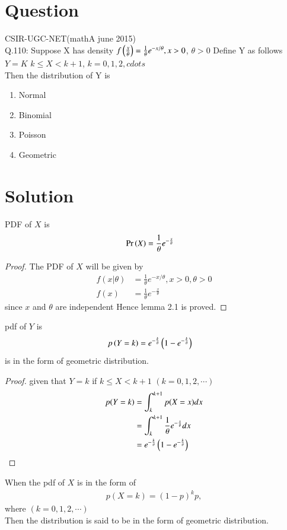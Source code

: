 \documentclass[journal,12pt,twocolumn]{IEEEtran}
\begin{document}
\section{Question}
CSIR-UGC-NET(mathA june 2015) \\
Q.110: Suppose X has density
$f\left(\frac{x}{\theta}\right)=\frac{1}{\theta} e^{-x/\theta},x>0$, $\theta >0$ 
Define Y as follows
$Y = K$ $k \leqslant X < k+1$, $k= 0,1,2,cdots$\\
Then the distribution of Y is
\begin{enumerate}
\item Normal 
\item Binomial 
\item Poisson 
\item Geometric
\end{enumerate}
\section{Solution}
\begin{lemma}
PDF of $X$ is 
\begin{align}
\Pr\left(X\right)&=\frac{1}{\theta} e^{-\frac{x}{\theta}}
\end{align}
\end{lemma}
\begin{proof}
The PDF of $X$ will be given by
\begin{align}
f(x|\theta)&=\frac{1}{\theta} e^{-x/\theta},x>0,\theta >0\\
f(x)&=\frac{1}{\theta}e^{-\frac{x}{\theta}} 
\end{align}
since $x$ and $\theta$ are independent 
Hence lemma 2.1 is proved.
\end{proof}
\begin{lemma}
pdf of $Y$ is 
\begin{align}
p\left(Y=k\right)&=e^{-\frac{k}{\theta}} \left(1-e^{-\frac{k}{\theta}}\right)
\end{align}
is in the form of geometric distribution.
\end{lemma}
\begin{proof}
given that $Y=k$ if $k \leqslant X <k+1$ $(k=0,1,2,\cdots)$
\begin{align}
p(Y=k)&=\int_k^{k+1} p(X=x) dx\\
&=\int_k^{k+1} \frac{1}{\theta} e^{-\frac{x}{\theta}} dx \nonumber \\
&=e^{-\frac{k}{\theta}} \left(1-e^{-\frac{k}{\theta}}\right)
\end{align}
\end{proof}
\begin{lemma}
When the pdf of $X$ is in the form of 
\begin{align}
p(X=k)=(1-p)^{k}p, 
\end{align}
where  $(k=0,1,2,\cdots)$\\
Then the distribution is said to be in the form of geometric distribution.
\end{lemma}
\end{document}
